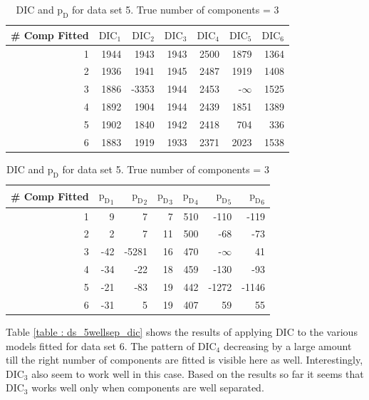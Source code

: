 \begin{table}[!htb]
\centering
\caption{DIC and $\text{p}_\text{D}$ for data set 5. True number of components = 3}
\label{table : ds_3fused_3ppg_dic}
\begin{tabular}{@{}rrrrrrr@{}}
\toprule
\# Comp Fitted & $\text{DIC}_1$ & $\text{DIC}_2$  & $\text{DIC}_3$  & $\text{DIC}_4$  & $\text{DIC}_5$  & $\text{DIC}_6$  \\ \midrule
1 & 1944 & 1943 & 1943 & 2500 & 1879 & 1364 \\
2 & 1936 & 1941 & 1945 & 2487 & 1919 & 1408 \\
3 & 1886 & -3353 & 1944 & 2453 & -$\infty$ & 1525 \\
4 & 1892 & 1904 & 1944 & 2439 & 1851 & 1389 \\
5 & 1902 & 1840 & 1942 & 2418 & 704 & 336 \\
6 & 1883 & 1919 & 1933 & 2371 & 2023 & 1538 \\ \bottomrule
\end{tabular}

\begin{tabular}{@{}rrrrrrr@{}}
\toprule
\# Comp Fitted & ${\text{p}_\text{D}}_1$ & ${\text{p}_\text{D}}_2$ & ${\text{p}_\text{D}}_3$ & ${\text{p}_\text{D}}_4$ & ${\text{p}_\text{D}}_5$ & ${\text{p}_\text{D}}_6$ \\ \midrule
1 & 9 & 7 & 7 & 510 & -110 & -119 \\
2 & 2 & 7 & 11 & 500 & -68 & -73 \\
3 & -42 & -5281 & 16 & 470 & -$\infty$ & 41 \\
4 & -34 & -22 & 18 & 459 & -130 & -93 \\
5 & -21 & -83 & 19 & 442 & -1272 & -1146 \\
6 & -31 & 5 & 19 & 407 & 59 & 55 \\ \bottomrule
\end{tabular}
\end{table}

Table \ref{table : ds_5wellsep_dic} shows the results of applying DIC to the various models fitted for data set 6. The pattern of $\text{DIC}_4$ decreasing by a large amount till the right number of components are fitted is visible here as well. Interestingly, $\text{DIC}_3$ also seem to work well in this case. Based on the results so far it seems that $\text{DIC}_3$ works well only when components are well separated.\\

